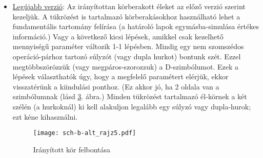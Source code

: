 \documentclass[12pt,magyar,a4paper]{article}
\begin{document}
\begin{itemize}
\begin{enumerate}
	lemásoljuk a teljes szétvágott D-szimbólumot, és a vágáshoz betoldjuk
	(lásd \ref{schrajz4}. ábra, hozzá tartozó fundamentális tartomány:
	\ref{schrajz43d}. ábra) Itt nem látom, hogy a módszer elrontaná
	valamelyik operáció-párok rendjét.
	\begin{figure}
	  \caption{\label{schrajz4} Irányított kör felbontása}
	  \center
	  \texttt{[image: sch-b-alt\_rajz4.pdf]}
	\end{figure}
	\begin{figure}
	  \caption{\label{schrajz43d} Irányított kör felbontása fundamentális
	  tartomány}
	  \center
	  \texttt{[image: sch-b-alt\_rajz43d.png]}
	\end{figure}
    \end{enumerate}
  \item \underline{Legújabb verzió}: Az irányítottan körberakott éleket az előző verzió
    szerint kezeljük. A tükrözést is tartalmazó körberakásokhoz használható
    lehet a fundamentális tartomány felírása (a határoló lapok egymásba-simulása
    értékes információ.) Vagy a következő kicsi lépések, amikkel csak kezelhető
    mennyiségű paraméter változik 1-1 lépésben. Mindig egy nem szomszédos
    operáció-párhoz tartozó súlyzót (vagy dupla hurkot) bontunk szét. Ezzel
    megtöbbszörözzük (vagy megpáros-szorozzuk) a D-szimbólumot. Ezek a
    lépések választhatók úgy, hogy a megfelelő paramétert elérjük, ekkor
    visszatérünk a kiindulási ponthoz. (Ez akkor jó, ha 2 oldala van a
    szimbólumnak (lásd \ref{schrajz5}. ábra.) Minden tükrözést tartalmazó
    él-körnek a két szélén (a hurkoknál) ki kell alakuljon legalább egy súlyzó
    vagy dupla-hurok; ezt kéne kihasználni.
    \begin{figure}
      \caption{\label{schrajz5} Irányított kör felbontása}
      \center
      \texttt{[image: sch-b-alt\_rajz5.pdf]}
    \end{figure}
\end{itemize}


  
\end{document}
